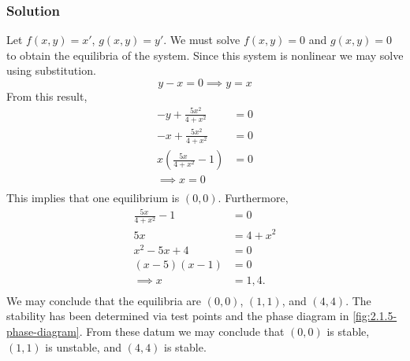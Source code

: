 \documentclass[12pt]{article}
\begin{document}
\subsubsection*{Solution}
Let $f(x,y) = x'$, $g(x,y) = y'$. We must solve $f(x,y)=0$ and $g(x,y)=0$ to
obtain the equilibria of the system. Since this system is nonlinear we may solve
using substitution.
\begin{equation}
  y - x = 0 \implies y = x
\end{equation}
From this result,
\begin{equation}
  \begin{aligned}
    -y+\frac{5x^2}{4+x^2} &= 0 \\
    -x+\frac{5x^2}{4+x^2} &= 0 \\
    x\left(\frac{5x\ }{4+x^2}-1 \right) &= 0 \\
    \implies x = 0 \\
  \end{aligned}
\end{equation}
This implies that one equilibrium is $(0,0)$. Furthermore,
\begin{equation}
  \begin{aligned}
    \frac{5x\ }{4+x^2} -1 &= 0 \\
    5x &= 4+x^2 \\
    x^2-5x+4 &= 0 \\
    (x-5)(x-1) &= 0 \\
    \implies x &= 1, 4. \\
  \end{aligned}
\end{equation}
We may conclude that the equilibria are $(0,0)$, $(1,1)$, and $(4,4)$. The
stability has been determined via test points and the phase diagram in
\cref{fig:2.1.5-phase-diagram}. From these datum we may conclude that $(0,0)$ is
stable, $(1,1)$ is unstable, and $(4,4)$ is stable.
\end{document}
